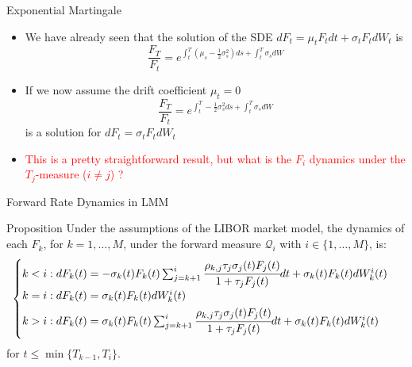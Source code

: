\documentclass{beamer}
\begin{document}
\begin{frame}{Exponential Martingale}
  \begin{itemize}
	  \item<1-> We have already seen that the solution of the SDE $dF_t=\mu_t F_t dt + \sigma_t F_t dW_t$ is
	    \begin{equation*}
		      \frac{F_T}{F_t} = e^{\int_t^T(\mu_s -\frac{1}{2}\sigma_s^2)ds+\int_t^T\sigma_s dW}
		    \end{equation*}
	  \item<2-> If we now assume the drift coefficient $\mu_t=0$ 
	    \begin{equation*}
		    \frac{F_T}{F_t} = e^{\int_t^T-\frac{1}{2}\sigma_s^2 ds+\int_t^T\sigma_s dW}
	    \end{equation*}
	  is a solution for $dF_t=\sigma_t F_tdW_t$
	  \item<3-> \textcolor{red}{This is a pretty straightforward result, but what is the $F_i$ dynamics under the $T_j$-measure ($i\neq j$) ?}
	  \end{itemize}
\end{frame}


\begin{frame}{Forward Rate Dynamics in LMM}
  \begin{block}{Proposition}
    Under the assumptions of the LIBOR market model, the dynamics of each $F_k$, for $k = 1,\ldots, M$, under the forward measure $\mathcal{Q}_i$ with $i \in \{1,\ldots, M\}$, is:
    \begin{equation}
      \begin{cases}
	k < i: dF_k(t) = -\sigma_k(t)F_k(t)\sum_{j=k+1}^i\cfrac{\rho_{k,j}\tau_j\sigma_j(t)F_j(t)}{1+\tau_jF_j(t)}dt + \sigma_k(t)F_k(t)dW^i_k(t) \\ \vspace{0.1cm}
	k = i : dF_k(t) = \sigma_k(t)F_k(t)dW_k^i(t) \\
	\vspace{0.1cm}
	k > i : dF_k(t) = \sigma_k(t)F_k(t)\sum_{j=k+1}^i\cfrac{\rho_{k,j}\tau_j\sigma_j(t)F_j(t)}{1+\tau_jF_j(t)}dt + \sigma_k(t)F_k(t)dW^i_k(t)		
      \end{cases}
  	\label{eq:forward_rat_dynamics_lfm}
    \end{equation}
    for $t \le \min\{T_{k-1}, T_i\}$.
  \end{block}
\end{frame}
\end{document}
